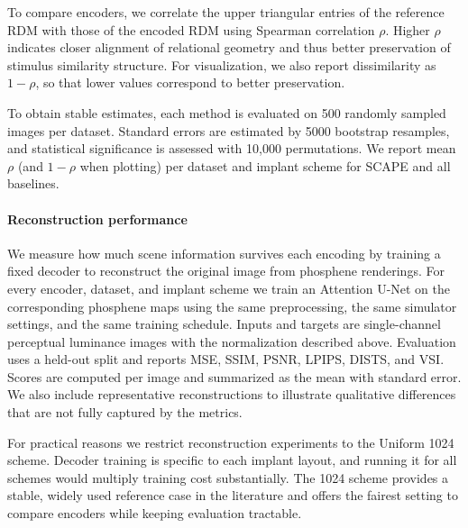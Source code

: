 To compare encoders, we correlate the upper triangular entries of the reference RDM with those of the encoded RDM using Spearman correlation \(\rho\). Higher \(\rho\) indicates closer alignment of relational geometry and thus better preservation of stimulus similarity structure. For visualization, we also report dissimilarity as \(1-\rho\), so that lower values correspond to better preservation. 

To obtain stable estimates, each method is evaluated on 500 randomly sampled images per dataset. Standard errors are estimated by 5000 bootstrap resamples, and statistical significance is assessed with 10{,}000 permutations. We report mean \(\rho\) (and \(1-\rho\) when plotting) per dataset and implant scheme for SCAPE and all baselines.


\paragraph{Reconstruction performance}
We measure how much scene information survives each encoding by training a fixed decoder to reconstruct the original image from phosphene renderings. For every encoder, dataset, and implant scheme we train an Attention U-Net on the corresponding phosphene maps using the same preprocessing, the same simulator settings, and the same training schedule. Inputs and targets are single-channel perceptual luminance images with the normalization described above. Evaluation uses a held-out split and reports MSE, SSIM, PSNR, LPIPS, DISTS, and VSI. Scores are computed per image and summarized as the mean with standard error. We also include representative reconstructions to illustrate qualitative differences that are not fully captured by the metrics.

For practical reasons we restrict reconstruction experiments to the Uniform 1024 scheme. Decoder training is specific to each implant layout, and running it for all schemes would multiply training cost substantially. The 1024 scheme provides a stable, widely used reference case in the literature and offers the fairest setting to compare encoders while keeping evaluation tractable.
